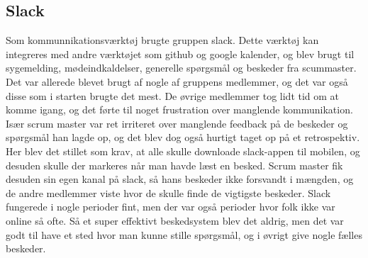 \subsection{Slack}
Som kommunnikationsværktøj brugte gruppen slack. Dette værktøj kan integreres med andre værktøjet som github og google kalender, og blev brugt til 
sygemelding, mødeindkaldelser, generelle spørgsmål og beskeder fra scummaster. Det var allerede blevet brugt af nogle af gruppens medlemmer, og det var 
også disse som i starten brugte det mest. De øvrige medlemmer tog lidt tid om at komme igang, og det førte til noget frustration over manglende kommunikation.
Især scrum master var ret irriteret over manglende feedback på de beskeder og spørgsmål han lagde op, og det blev dog også hurtigt taget op på et retrospektiv.
Her blev det stillet som krav, at alle skulle downloade slack-appen til mobilen, og desuden skulle der markeres når man havde læst en besked. 
Scrum master fik desuden sin egen kanal på slack, så hans beskeder ikke forsvandt i mængden, og de andre medlemmer viste hvor de skulle finde de vigtigste 
beskeder. Slack fungerede i nogle perioder fint, men der var også perioder hvor folk ikke var online så ofte. Så et super effektivt beskedsystem blev det aldrig, 
men det var godt til have et sted hvor man kunne stille spørgsmål, og i øvrigt give nogle fælles beskeder.  
      
